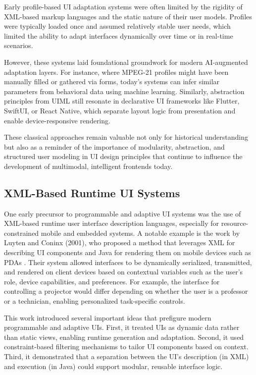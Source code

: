 \documentclass[openany]{book}
\begin{document}
Early profile-based UI adaptation systems were often limited by the rigidity of XML-based markup languages and the static nature of their user models. Profiles were typically loaded once and assumed relatively stable user needs, which limited the ability to adapt interfaces dynamically over time or in real-time scenarios.

However, these systems laid foundational groundwork for modern AI-augmented adaptation layers. For instance, where MPEG-21 profiles might have been manually filled or gathered via forms, today’s systems can infer similar parameters from behavioral data using machine learning. Similarly, abstraction principles from UIML still resonate in declarative UI frameworks like Flutter, SwiftUI, or React Native, which separate layout logic from presentation and enable device-responsive rendering.

These classical approaches remain valuable not only for historical understanding but also as a reminder of the importance of modularity, abstraction, and structured user modeling in UI design principles that continue to influence the development of multimodal, intelligent frontends today.

\subsection{XML-Based Runtime UI Systems}

One early precursor to programmable and adaptive UI systems was the use of XML-based runtime user interface description languages, especially for resource-constrained mobile and embedded systems. A notable example is the work by Luyten and Coninx (2001), who proposed a method that leverages XML for describing UI components and Java for rendering them on mobile devices such as PDAs \cite{luyten2001personalizing}. Their system allowed interfaces to be dynamically serialized, transmitted, and rendered on client devices based on contextual variables such as the user's role, device capabilities, and preferences. For example, the interface for controlling a projector would differ depending on whether the user is a professor or a technician, enabling personalized task-specific controls.

This work introduced several important ideas that prefigure modern programmable and adaptive UIs. First, it treated UIs as dynamic data rather than static views, enabling runtime generation and adaptation. Second, it used constraint-based filtering mechanisms to tailor UI components based on context. Third, it demonstrated that a separation between the UI's description (in XML) and execution (in Java) could support modular, reusable interface logic.
\end{document}
